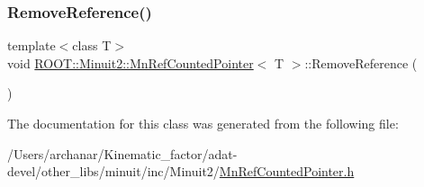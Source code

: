 \subsubsection{\texorpdfstring{RemoveReference()}{RemoveReference()}\hspace{0.1cm}{\footnotesize\ttfamily [3/3]}}
{\footnotesize\ttfamily template$<$class T$>$ \\
void \mbox{\hyperlink{classROOT_1_1Minuit2_1_1MnRefCountedPointer}{R\+O\+O\+T\+::\+Minuit2\+::\+Mn\+Ref\+Counted\+Pointer}}$<$ T $>$\+::Remove\+Reference (\begin{DoxyParamCaption}{ }\end{DoxyParamCaption})\hspace{0.3cm}{\ttfamily [inline]}}



The documentation for this class was generated from the following file\+:\begin{DoxyCompactItemize}
\item 
/\+Users/archanar/\+Kinematic\+\_\+factor/adat-\/devel/other\+\_\+libs/minuit/inc/\+Minuit2/\mbox{\hyperlink{adat-devel_2other__libs_2minuit_2inc_2Minuit2_2MnRefCountedPointer_8h}{Mn\+Ref\+Counted\+Pointer.\+h}}\end{DoxyCompactItemize}
